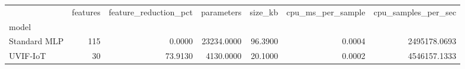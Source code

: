 \begin{tabular}{lrrrrrr}
\toprule
 & features & feature_reduction_pct & parameters & size_kb & cpu_ms_per_sample & cpu_samples_per_sec \\
model &  &  &  &  &  &  \\
\midrule
Standard MLP & 115 & 0.0000 & 23234.0000 & 96.3900 & 0.0004 & 2495178.0693 \\
UVIF-IoT & 30 & 73.9130 & 4130.0000 & 20.1000 & 0.0002 & 4546157.1333 \\
\bottomrule
\end{tabular}
